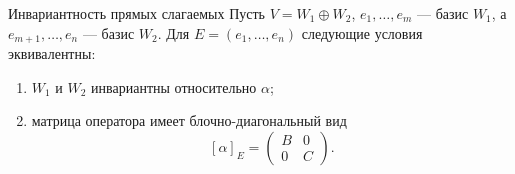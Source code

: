 \begin{Corollary}{Инвариантность прямых слагаемых}{}
	Пусть $V=W_1\oplus W_2$,
	$e_1,\ldots,e_m$ --- базис $W_1$, а $e_{m+1},\ldots,e_n$ --- базис $W_2$.
	Для $E=(e_1,\ldots,e_n)$ следующие условия эквивалентны:
	
	\begin{enumerate}
		\item $W_1$ и $W_2$ инвариантны относительно $\alpha$;
		\item матрица оператора имеет блочно-диагональный вид
		\[
		[\alpha]_E=
		\begin{pmatrix}
			B & 0\\
			0 & C
		\end{pmatrix}.
		\]
	\end{enumerate}
\end{Corollary}
